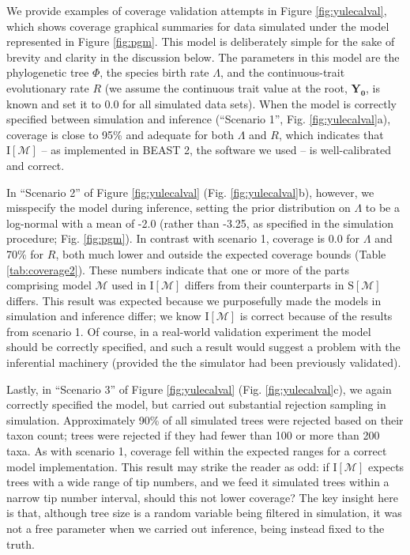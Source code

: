 \documentclass[oneside]{article}
\begin{document}
We provide examples of coverage validation attempts in Figure \ref{fig:yulecalval}, which shows coverage graphical summaries for data simulated under the model represented in Figure \ref{fig:pgm}.
This model is deliberately simple for the sake of brevity and clarity in the discussion below.
The parameters in this model are the phylogenetic tree $\Phi$, the species birth rate $\Lambda$, and the continuous-trait evolutionary rate $R$ (we assume the continuous trait value at the root, $\boldsymbol{Y_0}$, is known and set it to $\boldsymbol{0.0}$ for all simulated data sets).
When the model is correctly specified between simulation and inference (``Scenario 1'', Fig. \ref{fig:yulecalval}a), coverage is close to 95\% and adequate for both $\Lambda$ and $R$, which indicates that $\text{I}[\mathcal{M}]$ -- as implemented in BEAST 2, the software we used -- is well-calibrated and correct.

In ``Scenario 2'' of Figure \ref{fig:yulecalval} (Fig. \ref{fig:yulecalval}b), however, we misspecify the model during inference, setting the prior distribution on $\Lambda$ to be a log-normal with a mean of -2.0 (rather than -3.25, as specified in the simulation procedure; Fig. \ref{fig:pgm}).
In contrast with scenario 1, coverage is 0.0 for $\Lambda$ and 70\% for $R$, both much lower and outside the expected coverage bounds (Table \ref{tab:coverage2}).
These numbers indicate that one or more of the parts comprising model $\mathcal{M}$ used in $\text{I}[\mathcal{M}]$ differs from their counterparts in $\text{S}[\mathcal{M}]$ differs.
This result was expected because we purposefully made the models in simulation and inference differ; we know $\text{I}[\mathcal{M}]$ is correct because of the results from scenario 1.
Of course, in a real-world validation experiment the model should be correctly specified, and such a result would suggest a problem with the inferential machinery (provided the the simulator had been previously validated).

Lastly, in ``Scenario 3'' of Figure \ref{fig:yulecalval} (Fig. \ref{fig:yulecalval}c), we again correctly specified the model, but carried out substantial rejection sampling in simulation.
Approximately 90\% of all simulated trees were rejected based on their taxon count; trees were rejected if they had fewer than 100 or more than 200 taxa.
As with scenario 1, coverage fell within the expected ranges for a correct model implementation.
This result may strike the reader as odd: if $\text{I}[\mathcal{M}]$ expects trees with a wide range of tip numbers, and we feed it simulated trees within a narrow tip number interval, should this not lower coverage?
The key insight here is that, although tree size is a random variable being filtered in simulation, it was not a free parameter when we carried out inference, being instead fixed to the truth.
\end{document}

